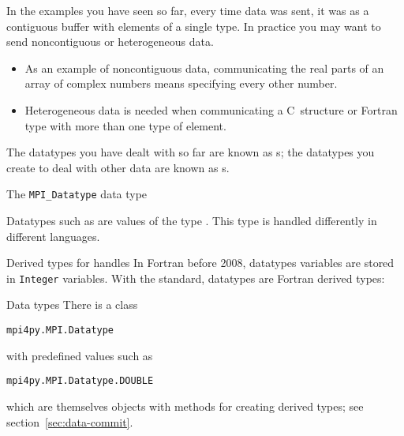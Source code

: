 

In the examples you have seen so far, every time data was sent,
it was as a contiguous buffer with elements of a single type.
In practice you may want to send noncontiguous 
or heterogeneous data.
\begin{itemize}
\item As an example of noncontiguous data,
  communicating the real parts of an array of complex numbers
  means specifying every other number.
\item Heterogeneous data is needed when communicating a C~structure or Fortran type with more than one
  type of element.
\end{itemize}
The datatypes you have dealt with so far are known as
s;
the datatypes you create to deal with other data
are known as s.

 {The \texttt{MPI\_Datatype} data type}
\label{sec:mpi-datatype}

Datatypes such as  are values
of the type .
This type is handled differently in different languages.

\begin{fortrannote}{Derived types for handles}
  In Fortran before 2008, datatypes variables are stored in
  \lstinline{Integer} variables.
  With the  standard, datatypes are Fortran derived types:
\end{fortrannote}

\begin{pythonnote}{Data types}
  There is a class
\begin{lstlisting}
mpi4py.MPI.Datatype
\end{lstlisting}
  with predefined values such as 
\begin{lstlisting}
mpi4py.MPI.Datatype.DOUBLE
\end{lstlisting}
  which are themselves objects with methods
  for creating derived types;
  see section~\ref{sec:data-commit}.
\end{pythonnote}

